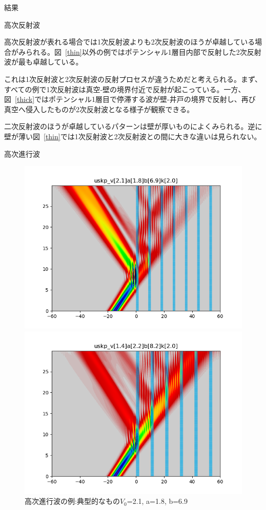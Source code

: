 \documentclass[a4paper, lualatex]{bxjsarticle}
\newcommand{\fref}[1]{図~\ref{#1}}
\begin{document}
\begin{section}{結果}
\begin{subsection}{高次反射波}
    \par 高次反射波が表れる場合では1次反射波よりも2次反射波のほうが卓越している場合がみられる。\fref{thin}以外の例ではポテンシャル1層目内部で反射した2次反射波が最も卓越している。
    \par これは1次反射波と2次反射波の反射プロセスが違うためだと考えられる。まず、すべての例で1次反射波は真空-壁の境界付近で反射が起こっている。一方、\fref{thick}ではポテンシャル1層目で停滞する波が壁-井戸の境界で反射し、再び真空へ侵入したものが2次反射波となる様子が観察できる。
    \par 二次反射波のほうが卓越しているパターンは壁が厚いものによくみられる。逆に壁が薄い\fref{thin}では1次反射波と2次反射波との間に大きな違いは見られない。
    \end{subsection}
\newpage
    \begin{subsection}{高次進行波}
        \begin{figure}[h]
            \begin{minipage}{0.5\hsize}
                \centering
                \includegraphics[width=0.9\hsize]{tajushin1.png}
                \caption{高次進行波の例:典型的なもの$V_0$=2.1, a=1.8, b=6.9}
                \label{temporal}
            \end{minipage}
            \begin{minipage}{0.5\hsize}
                \centering
                \includegraphics[width=0.9\hsize]{tajushin2.png}

\end{minipage}
\end{figure}
\end{subsection}
\end{section}
\end{document}

